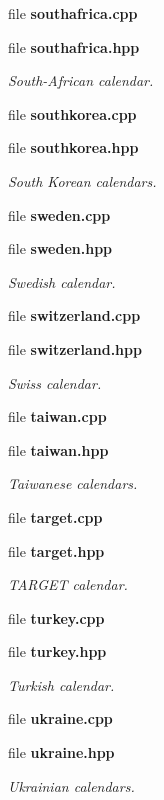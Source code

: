 \begin{DoxyCompactItemize}
file {\bf southafrica.\+cpp}
\item 
file {\bf southafrica.\+hpp}
\begin{DoxyCompactList}\small\item\em South-\/\+African calendar. \end{DoxyCompactList}\item 
file {\bf southkorea.\+cpp}
\item 
file {\bf southkorea.\+hpp}
\begin{DoxyCompactList}\small\item\em South Korean calendars. \end{DoxyCompactList}\item 
file {\bf sweden.\+cpp}
\item 
file {\bf sweden.\+hpp}
\begin{DoxyCompactList}\small\item\em Swedish calendar. \end{DoxyCompactList}\item 
file {\bf switzerland.\+cpp}
\item 
file {\bf switzerland.\+hpp}
\begin{DoxyCompactList}\small\item\em Swiss calendar. \end{DoxyCompactList}\item 
file {\bf taiwan.\+cpp}
\item 
file {\bf taiwan.\+hpp}
\begin{DoxyCompactList}\small\item\em Taiwanese calendars. \end{DoxyCompactList}\item 
file {\bf target.\+cpp}
\item 
file {\bf target.\+hpp}
\begin{DoxyCompactList}\small\item\em T\+A\+R\+G\+ET calendar. \end{DoxyCompactList}\item 
file {\bf turkey.\+cpp}
\item 
file {\bf turkey.\+hpp}
\begin{DoxyCompactList}\small\item\em Turkish calendar. \end{DoxyCompactList}\item 
file {\bf ukraine.\+cpp}
\item 
file {\bf ukraine.\+hpp}
\begin{DoxyCompactList}\small\item\em Ukrainian calendars. \end{DoxyCompactList}\item 

\end{DoxyCompactItemize}
